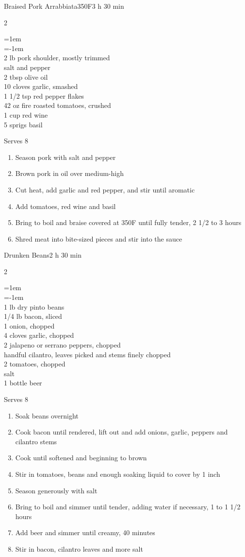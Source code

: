 \documentclass{article}
\newenvironment{recipe}[3][]
    {\begin{cardbase}[#1]{#2}{#3}
    \columnratio{0.333}
    \begin{paracol}{2}}
    {\end{paracol}\end{cardbase}}
\newenvironment{denserecipe}[3][]
    {\small
    \begin{recipe}[#1]{#2}{#3}}
    {\end{recipe}}
\newcommand{\nextcolumn}{\switchcolumn}
\newenvironment{ingredients}
    {
    \begin{obeylines}
    \vspace{\parskip}
    \setlength{\parskip}{0.25em}
    \vspace{-0.25em}
    \leftskip=1em
    \parindent=-1em}
    {\end{obeylines}}
\newenvironment{steps}
    {\begin{enumerate}[leftmargin=*,topsep=0pt]}
    {\end{enumerate}}
\newcommand{\fahrenheit}[1]{#1\textdegree{}F}
\newcommand{\tag}[1]{\hspace{1em}#1}
\newcommand{\symboltag}[2]{\tag{#1\hspace{0.4em}#2}}
\newcommand{\totaltime}[1]{\symboltag{\raisebox{-0.1em}{\small\StopWatchEnd}}{#1}}
\newcommand{\preheat}[1]{\symboltag{\Topbottomheat}{#1}}
\begin{document}
\begin{recipe}{Braised Pork Arrabbiata}{\preheat{\fahrenheit{350}}\totaltime{3 h 30 min}}
\begin{ingredients}
2 lb pork shoulder, mostly trimmed
salt and pepper
2 tbsp olive oil
10 cloves garlic, smashed
1 1/2 tsp red pepper flakes
42 oz fire roasted tomatoes, crushed
1 cup red wine
5 sprigs basil
\end{ingredients}
\nextcolumn
Serves 8
\begin{steps}
    \item Season pork with salt and pepper
    \item Brown pork in oil over medium-high
    \item Cut heat, add garlic and red pepper, and stir until aromatic
    \item Add tomatoes, red wine and basil
    \item Bring to boil and braise covered at \fahrenheit{350} until fully tender, 2 1/2 to 3 hours
    \item Shred meat into bite-sized pieces and stir into the sauce
\end{steps}
\end{recipe}

\begin{denserecipe}{Drunken Beans}{\totaltime{2 h 30 min}}
\begin{ingredients}
1 lb dry pinto beans
1/4 lb bacon, sliced
1 onion, chopped
4 cloves garlic, chopped
2 jalapeno or serrano peppers, chopped
handful cilantro, leaves picked and stems finely chopped
2 tomatoes, chopped
salt
1 bottle beer
\end{ingredients}
\nextcolumn
Serves 8
\begin{steps}
    \item Soak beans overnight
    \item Cook bacon until rendered, lift out and add onions, garlic, peppers and cilantro stems
    \item Cook until softened and beginning to brown
    \item Stir in tomatoes, beans and enough soaking liquid to cover by 1 inch
    \item Season generously with salt
    \item Bring to boil and simmer until tender, adding water if necessary, 1 to 1 1/2 hours
    \item Add beer and simmer until creamy, 40 minutes
    \item Stir in bacon, cilantro leaves and more salt
\end{steps}
\end{denserecipe}
\end{document}

